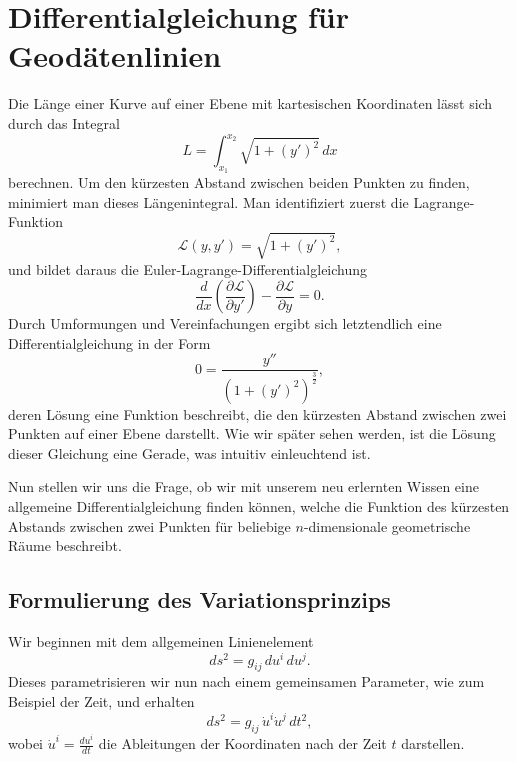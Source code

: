 %
%
%
%
\section{Differentialgleichung für Geodätenlinien
\label{geodaeten:section:Standardverfahren}}

Die Länge einer Kurve auf einer Ebene mit kartesischen Koordinaten lässt sich durch das Integral
\begin{equation}
	L = \int_{x_1}^{x_2} \sqrt{1 + \left(y'\right)^2} \, dx
\end{equation}
berechnen.
Um den kürzesten Abstand zwischen beiden Punkten zu finden, minimiert man dieses Längenintegral.
Man identifiziert zuerst die Lagrange-Funktion
\begin{equation}
	\mathcal{L}(y, y') = \sqrt{1 + \left(y'\right)^2},
\end{equation}
und bildet daraus die Euler-Lagrange-Differentialgleichung
\begin{equation}
	\frac{d}{dx} \left(\frac{\partial \mathcal{L}}{\partial y'}\right) - \frac{\partial \mathcal{L}}{\partial y} = 0.
\end{equation}
Durch Umformungen und Vereinfachungen ergibt sich letztendlich eine Differentialgleichung in der Form
\begin{equation}
	0 = \frac{y''}{\left(1 + \left(y'\right)^2\right)^{\frac{3}{2}}},
\end{equation}
deren Lösung eine Funktion beschreibt, die den kürzesten Abstand zwischen zwei Punkten auf einer Ebene darstellt. Wie wir später sehen werden, ist die Lösung dieser Gleichung eine Gerade, was intuitiv einleuchtend ist.

Nun stellen wir uns die Frage, ob wir mit unserem neu erlernten Wissen eine allgemeine Differentialgleichung finden können, welche die Funktion des kürzesten Abstands zwischen zwei Punkten für beliebige $n$-dimensionale geometrische Räume beschreibt.

\subsection{Formulierung des Variationsprinzips}
Wir beginnen mit dem allgemeinen Linienelement
\begin{equation}
	ds^2 = g_{ij} \, du^i \, du^j.
\end{equation}
Dieses parametrisieren wir nun nach einem gemeinsamen Parameter, wie zum Beispiel der Zeit, und erhalten
\begin{equation}
	ds^2 = g_{ij} \, \dot{u}^i \dot{u}^j \, dt^2,
\end{equation}
wobei $\dot{u}^i = \frac{du^i}{dt}$ die Ableitungen der Koordinaten nach der Zeit $t$ darstellen.


